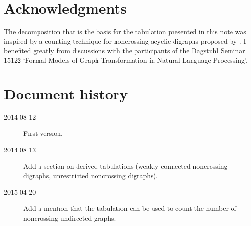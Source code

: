 \documentclass[a4paper]{article}
\begin{document}
\section*{Acknowledgments}

The decomposition that is the basis for the tabulation presented in
this note was inspired by a counting technique for noncrossing acyclic
digraphs proposed by \citet{tirrell2014number}.
I benefited greatly from discussions with the participants of the
Dagstuhl Seminar 15122 `Formal Models of Graph Transformation in
Natural Language Processing'.

\section*{Document history}

\begin{description}
\item[2014-08-12] First version.
\item[2014-08-13] Add a section on derived tabulations (weakly
  connected noncrossing digraphs, unrestricted noncrossing digraphs).
\item[2015-04-20] Add a mention that the tabulation can be used to
  count the number of noncrossing undirected graphs.
\end{description}




\end{document}
